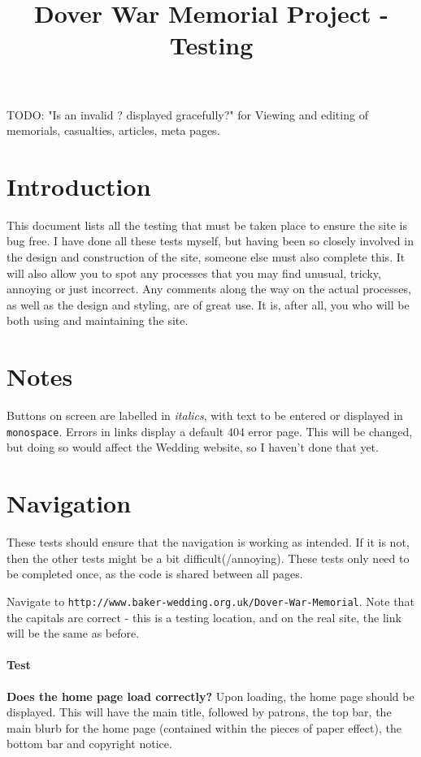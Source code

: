 \documentclass[12pt]{article}
\title{Dover War Memorial Project - Testing}
\date{}
\author{}
\newcounter{Test}
\newcommand{\test}[1]{%
\stepcounter{Test}%
\paragraph{Test \theTest} \textbf{#1} }
\begin{document}
\maketitle

TODO:
"Is an invalid ? displayed gracefully?" for Viewing and editing of memorials, casualties, articles, meta pages.

\tableofcontents
\newpage

\section{Introduction}

This document lists all the testing that must be taken place to ensure the site is bug free. I have done all these tests myself, but having been so closely involved in the design and construction of the site, someone else must also complete this. It will also allow you to spot any processes that you may find unusual, tricky, annoying or just incorrect. Any comments along the way on the actual processes, as well as the design and styling, are of great use. It is, after all, you who will be both using and maintaining the site. \smiley

\section{Notes}
Buttons on screen are labelled in \textit{italics}, with text to be entered or displayed in \texttt{monospace}. Errors in links display a default 404 error page. This will be changed, but doing so would affect the Wedding website, so I haven't done that yet.

\section{Navigation}

These tests should ensure that the navigation is working as intended. If it is not, then the other tests might be a bit difficult(/annoying). These tests only need to be completed once, as the code is shared between all pages.

Navigate to \texttt{http://www.baker-wedding.org.uk/Dover-War-Memorial}. Note that the capitals are correct - this is a testing location, and on the real site, the link will be the same as before.
\test {Does the home page load correctly?}
Upon loading, the home page should be displayed. This will have the main title, followed by patrons, the top bar, the main blurb for the home page (contained within the pieces of paper effect), the bottom bar and copyright notice.
\end{document}
